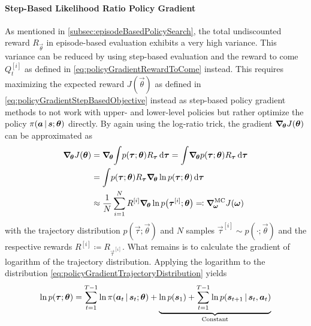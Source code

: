 				\paragraph{Step-Based Likelihood Ratio Policy Gradient}
					As mentioned in \autoref{subsec:episodeBasedPolicySearch}, the total undiscounted reward \( R_{\vec{\theta}} \) in episode-based evaluation exhibits a very high variance. This variance can be reduced by using step-based evaluation and the reward to come \( Q_t^{[i]} \) as defined in \eqref{eq:policyGradientRewardToCome} instead. This requires maximizing the expected reward \( J(\vec{\theta}) \) as defined in \eqref{eq:policyGradientStepBasedObjective} instead as step-based policy gradient methods to not work with upper- and lower-level policies but rather optimize the policy \( \pi(\bm{a} \,\vert\, \bm{s}; \bm{\theta}) \) directly. By again using the log-ratio trick, the gradient \( \grad_{\!\bm{\theta}} J(\bm{\theta}) \) can be approximated as
					\begin{align}
						\grad_{\!\vec{\theta}} J(\vec{\theta})
						 & = \grad_{\!\vec{\theta}} \!\int\! p(\vec{\tau}; \vec{\theta}) R_{\vec{\tau}} \dd{\vec{\tau}}
						= \int\! \grad_{\!\vec{\theta}} p(\vec{\tau}; \vec{\theta}) R_{\vec{\tau}} \dd{\vec{\tau}}  \nonumber                                                                                                                           \\
						 & = \int\! p(\vec{\tau}; \vec{\theta}) R_{\vec{\tau}} \grad_{\!\vec{\theta}} \ln p(\vec{\tau}; \vec{\theta}) \dd{\vec{\tau}}  \nonumber                                                                                        \\
						 & \approx \frac{1}{N} \sum_{i = 1}^{N} R^{[i]} \grad_{\!\vec{\theta}} \ln p\big(\vec{\tau}^{[i]}; \vec{\theta}\big) \eqqcolon \grad_{\!\vec{\omega}}^\mathrm{MC} J(\vec{\omega})  \label{eq:policyGradientStepBasedMonteCarlo}
					\end{align}
					with the trajectory distribution \( p(\vec{\tau}; \vec{\theta}) \) and \(N\) samples \( \vec{\tau}^{[i]} \sim p(\cdot; \vec{\theta}) \) and the respective rewards \( R^{[i]} \coloneqq R_{\vec{\tau}^{[i]}} \). What remains is to calculate the gradient of logarithm of the trajectory distribution. Applying the logarithm to the distribution \eqref{eq:policyGradientTrajectoryDistribution} yields
					\begin{equation*}
						\ln p(\bm{\tau}; \bm{\theta}) = \sum_{t = 1}^{T - 1} \ln \pi(\bm{a}_t \,\vert\, \bm{s}_t; \bm{\theta}) + \underbrace{\ln p(\bm{s}_1) + \sum_{t = 1}^{T - 1} \ln p(\bm{s}_{t + 1} \,\vert\, \bm{s}_t, \bm{a}_t)}_{\text{Constant}}
					\end{equation*}
